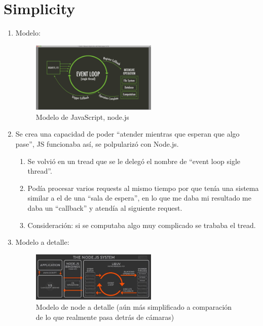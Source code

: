 \section{Simplicity}
\begin{enumerate}
    \item Modelo:
        \begin{figure}[htbp]
            \centering
            \includegraphics[width=6cm]{Clases/img/modelo_js.png}
            \caption{Modelo de JavaScript, node.js}
            \label{}
        \end{figure}
    
    \item Se crea una capacidad de poder ``atender mientras que esperan que algo pase'', JS funcionaba así, se polpularizó con Node.js. 
        \begin{enumerate}
            \item Se volvió en un tread que se le delegó el nombre de ``event loop sigle thread''.
            \item Podía procesar varios requests al mismo tiempo por que tenía una sistema similar a el de una ``sala de espera'', en lo que me daba mi resultado me daba un ``callback'' y atendía al siguiente request.
            \item Consideración: si se computaba algo muy complicado se trababa el tread.
        \end{enumerate}
    
    
    \item Modelo a detalle:
        \begin{figure}[htbp]
            \centering
            \includegraphics[width=6cm]{Clases/img/modelo_node.jpg}
            \caption{Modelo de node a detalle (aún más simplificado a comparación de lo que realmente pasa detrás de cámaras)}
            \label{}
        \end{figure} 
         
\end{enumerate}

